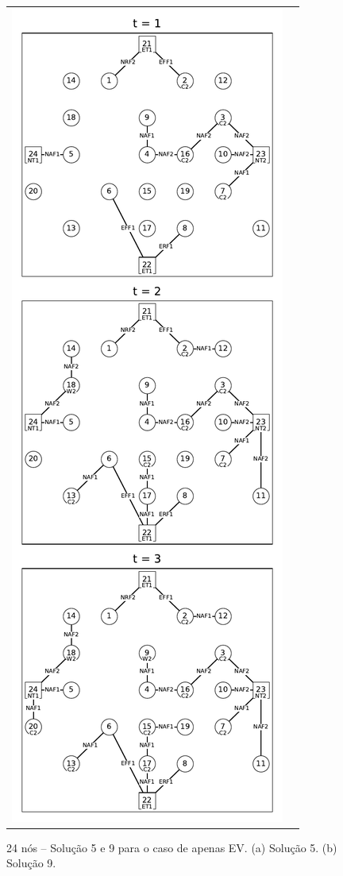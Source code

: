 \begin{figure}[H]%
\centering
\caption{24 nós -- Solução 5 e 9 para o caso de apenas EV. (a) Solução 5. (b) Solução 9.}
\begin{tabular}{cc}
    \includegraphics[width=0.49\columnwidth]{cap4/resultados/24_ev5.pdf} & 

\end{tabular}
\end{figure}
